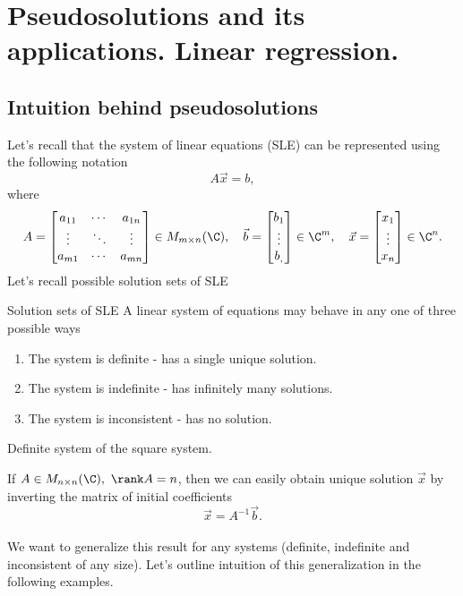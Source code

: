 \setcounter{section}{1}
\section{Pseudosolutions and its applications. Linear regression.}
\subsection*{Intuition behind pseudosolutions}
    \par 
    Let's recall that the system of linear equations (SLE) can be represented using the following notation
    \[
        A\vec{x} = b,
    \]
    where
    \[
        A = 
            \begin{bmatrix}
                a_{11} & \cdots & a_{1n}\\
                \vdots & \ddots & \vdots\\
                a_{m1} & \cdots & a_{mn} 
            \end{bmatrix}
        \in M_{m\times n}(\C), \quad 
        \vec{b} = \begin{bmatrix}  b_1 \\\vdots \\b_,\end{bmatrix} \in \C^m, \quad
        \vec{x} = \begin{bmatrix}  x_1 \\\vdots \\x_n\end{bmatrix} \in \C^n.
    \]
    Let's recall possible solution sets of SLE
    \begin{theorema}{Solution sets of SLE}
        A linear system of equations may behave in any one of three possible ways
        \begin{enumerate} 
            \item The system is definite - has a single unique solution.
            \item The system is indefinite - has infinitely many solutions.
            \item The system is inconsistent - has no solution.
        \end{enumerate}
    \end{theorema}
     \Ex Definite system of the square system.
    
        If $A \in M_{n\times n}(\C), \ \rank A = n$, then we can easily obtain unique solution $\vec{x}$ by inverting the matrix of initial coefficients
            \[
                \vec{x}  = A^{-1}\vec{b}.
            \]\\
    We want to generalize this result for any systems (definite, indefinite and inconsistent of any size). Let's outline intuition of this generalization in the following examples.
